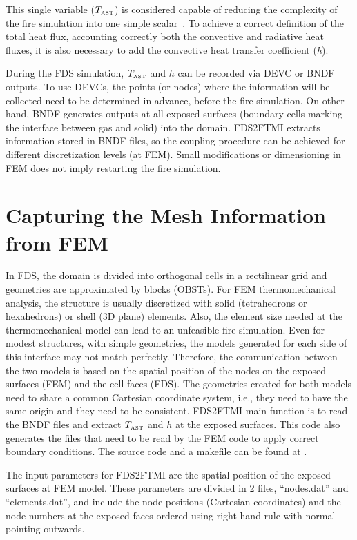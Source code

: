\documentclass[11pt]{book}
\begin{document}
This single variable ($T_{\hbox{\tiny AST}}$) is considered capable of reducing the complexity of the fire simulation into one simple scalar~\cite{FTMI:Duthinh,FTMI:Sandstrom,FTMI:Wickstrom2010}. To achieve a correct definition of the total heat flux, accounting correctly both the convective and radiative heat fluxes, it is also necessary to add the convective heat transfer coefficient (\textit{h}). 
 
During the FDS simulation, $T_{\hbox{\tiny AST}}$ and $h$ can be recorded via {\ct DEVC} or {\ct BNDF} outputs. To use {\ct DEVC}s, the points (or nodes) where the information will be collected need to be determined in advance, before the fire simulation. On other hand, {\ct BNDF} generates outputs at all exposed surfaces (boundary cells marking the interface between gas and solid) into the domain. FDS2FTMI extracts information stored in {\ct BNDF} files, so the coupling procedure can be achieved for different discretization levels (at FEM). Small modifications or dimensioning in FEM does not imply restarting the fire simulation. 
  
\section{Capturing the Mesh Information from FEM}

In FDS, the domain is divided into orthogonal cells in a rectilinear grid and geometries are approximated by blocks ({\ct OBST}s). For FEM thermomechanical analysis, the structure is usually discretized with solid (tetrahedrons or hexahedrons) or shell (3D plane) elements. Also, the element size needed at the thermomechanical model can lead to an unfeasible fire simulation. Even for modest structures, with simple geometries, the models generated for each side of this interface may not match perfectly. Therefore, the communication between the two models is based on the spatial position of the nodes on the exposed surfaces (FEM) and the cell faces (FDS). The geometries created for both models need to share a common Cartesian coordinate system, i.e., they need to have the same origin and they need to be consistent. FDS2FTMI main function is to read the {\ct BNDF} files and extract $T_{\hbox{\tiny AST}}$ and $h$ at the exposed surfaces. This code also generates the files that need to be read by the FEM code to apply correct boundary conditions. The source code and a makefile can be found at . 

The input parameters for FDS2FTMI are the spatial position of the exposed surfaces at FEM model. These parameters are divided in 2 files, ``nodes.dat'' and ``elements.dat'', and include the node positions (Cartesian coordinates) and the node numbers at the exposed faces ordered using right-hand rule with normal pointing outwards. 
\end{document}
